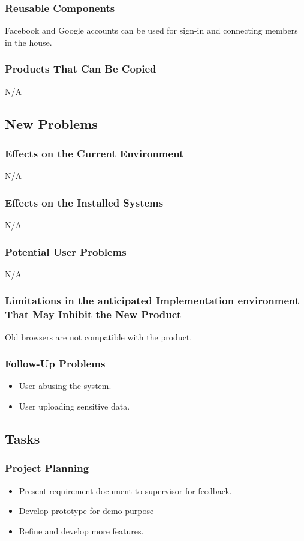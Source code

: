 \documentclass[12pt, titlepage]{article}
\begin{document}
{\subsubsection{Reusable Components}
Facebook and Google accounts can be used for sign-in and connecting members in 
the house.
\subsubsection{Products That Can Be Copied}
N/A
\subsection{New Problems}
\subsubsection{Effects on the Current Environment}
N/A
\subsubsection{Effects on the Installed Systems}
N/A
\subsubsection{Potential User Problems}
N/A
\subsubsection{Limitations in the anticipated Implementation environment That 
May Inhibit the New Product}
Old browsers are not compatible with the product.
\subsubsection{Follow-Up Problems}
\begin{itemize}
  \item User abusing the system.
  \item User uploading sensitive data.
\end{itemize}

\subsection{Tasks}
\subsubsection{Project Planning}
\begin{itemize}
  \item Present requirement document to supervisor for feedback.
  \item Develop prototype for demo purpose
  \item Refine and develop more features.
\end{itemize}
}
\end{document}
